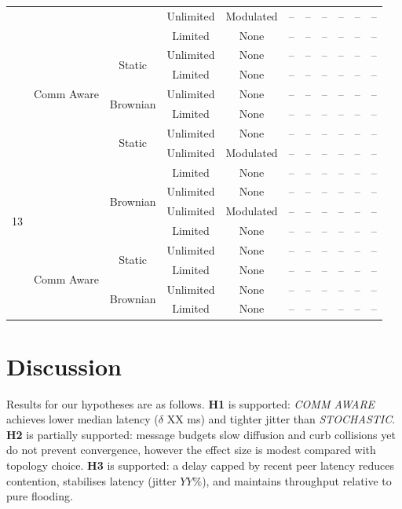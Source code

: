 \documentclass[conference]{IEEEtran}
\begin{document}
\begin{table}[ht]
\begin{tabular}{c|c|c|c|c|c|c|c|c|c|c}
  &   &          & Unlimited & Modulated & -- & -- & -- & -- & -- & -- \\
  &   &          & Limited   & None      & -- & -- & -- & -- & -- & -- \\
  \cmidrule{2-11}
  & \multirow{5}{*}{Comm Aware}
    & \multirow{2}{*}{Static}
                 & Unlimited & None      & -- & -- & -- & -- & -- & -- \\
  &   &          & Limited   & None      & -- & -- & -- & -- & -- & -- \\
  \cmidrule{3-11}
  &   & \multirow{2}{*}{Brownian}
                 & Unlimited & None      & -- & -- & -- & -- & -- & -- \\
  &   &          & Limited   & None      & -- & -- & -- & -- & -- & -- \\
\midrule
\multirow{10}{*}{13}
  & \multirow{5}{*}{Stochastic}
    & \multirow{2}{*}{Static}
                 & Unlimited & None      & -- & -- & -- & -- & -- & -- \\
  &   &          & Unlimited & Modulated & -- & -- & -- & -- & -- & -- \\
  &   &          & Limited   & None      & -- & -- & -- & -- & -- & -- \\
  \cmidrule{3-11}
  &   & \multirow{2}{*}{Brownian}
                 & Unlimited & None      & -- & -- & -- & -- & -- & -- \\
  &   &          & Unlimited & Modulated & -- & -- & -- & -- & -- & -- \\
  &   &          & Limited   & None      & -- & -- & -- & -- & -- & -- \\
  \cmidrule{2-11}
  & \multirow{5}{*}{Comm Aware}
    & \multirow{2}{*}{Static}
                 & Unlimited & None      & -- & -- & -- & -- & -- & -- \\
  &   &          & Limited   & None      & -- & -- & -- & -- & -- & -- \\
  \cmidrule{3-11}
  &   & \multirow{2}{*}{Brownian}
                 & Unlimited & None      & -- & -- & -- & -- & -- & -- \\
  &   &          & Limited   & None      & -- & -- & -- & -- & -- & -- \\
\bottomrule
\end{tabular}
\end{table}


\section{Discussion}
Results for our hypotheses are as follows. \textbf{H1} is supported: \emph{COMM AWARE} achieves lower median latency ($\delta$ XX ms) and tighter jitter than \emph{STOCHASTIC}. \textbf{H2} is partially supported: message budgets slow diffusion and curb collisions yet do not prevent convergence, however the effect size is modest compared with topology choice. \textbf{H3} is supported: a delay capped by recent peer latency reduces contention, stabilises latency (jitter $YY\%$), and maintains throughput relative to pure flooding.\\
\end{document}
